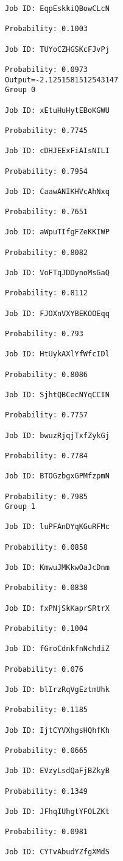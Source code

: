 \documentclass[11pt]{article}
\begin{document}
\begin{Verbatim}[commandchars=\\\{\}]
Job ID: EqpEskkiQBowCLcN

Probability: 0.1003

Job ID: TUYoCZHGSKcFJvPj

Probability: 0.0973
Output=-2.1251581512543147
Group 0

Job ID: xEtuHuHytEBoKGWU

Probability: 0.7745

Job ID: cDHJEExFiAIsNILI

Probability: 0.7954

Job ID: CaawANIKHVcAhNxq

Probability: 0.7651

Job ID: aWpuTIfgFZeKKIWP

Probability: 0.8082

Job ID: VoFTqJDDynoMsGaQ

Probability: 0.8112

Job ID: FJOXnVXYBEKOOEqq

Probability: 0.793

Job ID: HtUykAXlYfWfcIDl

Probability: 0.8086

Job ID: SjhtQBCecNYqCCIN

Probability: 0.7757

Job ID: bwuzRjqjTxfZykGj

Probability: 0.7784

Job ID: BTOGzbgxGPMfzpmN

Probability: 0.7985
Group 1

Job ID: luPFAnDYqKGuRFMc

Probability: 0.0858

Job ID: KmwuJMKkwOaJcDnm

Probability: 0.0838

Job ID: fxPNjSkKaprSRtrX

Probability: 0.1004

Job ID: fGroCdnkfnNchdiZ

Probability: 0.076

Job ID: blIrzRqVgEztmUhk

Probability: 0.1185

Job ID: IjtCYVXhgsHQhfKh

Probability: 0.0665

Job ID: EVzyLsdQaFjBZkyB

Probability: 0.1349

Job ID: JFhqIUhgtYFOLZKt

Probability: 0.0981

Job ID: CYTvAbudYZfgXMdS


\end{Verbatim}
\end{document}
